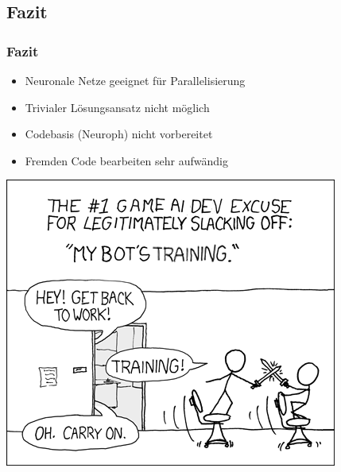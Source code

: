 \documentclass[18pt]{beamer}
\begin{document}
	\subsection{Fazit}
	\begin{frame}[c]\frametitle{Fazit}
		\begin{itemize}
		   \item Neuronale Netze geeignet für Parallelisierung
		   \item Trivialer Lösungsansatz nicht möglich
		   \item Codebasis (Neuroph) nicht vorbereitet
		   \item Fremden Code bearbeiten sehr aufwändig
		\end{itemize}
		\begin{center}
		 \includegraphics[width=.4\textwidth]{Grafiken/training.png}
		 \end{center} 
	\end{frame}
\end{document}

